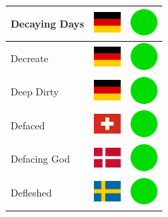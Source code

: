\documentclass[12pt, a4paper, twoside]{report}
\begin{document}
\begin{center}
\begin{longtable}{|p{5cm}|p{2cm}|p{2cm}|}
 Decaying Days                                              & \includegraphics[width=1cm]{../4x3/de} &   \includegraphics[width=1cm]{../likes/y} \\ \hline
 Decreate                                                   & \includegraphics[width=1cm]{../4x3/de} &   \includegraphics[width=1cm]{../likes/y} \\ \hline
 Deep Dirty                                                 & \includegraphics[width=1cm]{../4x3/de} &   \includegraphics[width=1cm]{../likes/y} \\ \hline
 Defaced                                                    & \includegraphics[width=1cm]{../4x3/ch} &   \includegraphics[width=1cm]{../likes/y} \\ \hline
 Defacing God                                               & \includegraphics[width=1cm]{../4x3/dk} &   \includegraphics[width=1cm]{../likes/y} \\ \hline
 Defleshed                                                  & \includegraphics[width=1cm]{../4x3/se} &   \includegraphics[width=1cm]{../likes/y} \\ \hline

\end{longtable}
\end{center}
\end{document}
